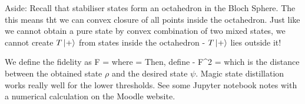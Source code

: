 Aside: Recall that stabiliser states form an octahedron in the Bloch Sphere. The this means tht we can convex closure of all points inside the octahedron. Just like we cannot obtain a pure state by convex combination of two mixed states, we cannot create $T\ket{+}$ from states inside the octahedron - $T\ket{+}$ lies outside it! 

We define the fidelity as
\beq
F = \sqrt{\bra{\psi} \rho \ket{\psi} }
\eeq
where
\beq
\ket{\psi} = \ket{\Psi}
\eeq
Then, define
 - F^2 = \epsilon
\eeq
which is the distance between the obtained state $\rho$ and the desired state $\psi$. Magic state distillation works really well for the lower thresholds. See some Jupyter notebook notes with a numerical calculation on the Moodle website. 





